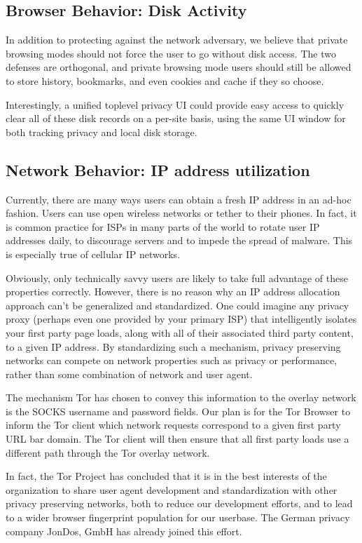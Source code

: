 \documentclass[letterpaper,11pt]{llncs}
\begin{document}
\subsection{Browser Behavior: Disk Activity}

In addition to protecting against the network adversary, we believe that
private browsing modes should not force the user to go without disk access. The
two defenses are orthogonal, and private browsing mode users should still be
allowed to store history, bookmarks, and even cookies and cache if they so
choose.

Interestingly, a unified toplevel privacy UI could provide easy access to
quickly clear all of these disk records on a per-site basis, using the same UI
window for both tracking privacy and local disk storage.

\subsection{Network Behavior: IP address utilization}

Currently, there are many ways users can obtain a fresh IP address in an
ad-hoc fashion. Users can use open wireless networks or tether to their
phones. In fact, it is common practice for ISPs in many parts of the world to
rotate user IP addresses daily, to discourage servers and to impede the spread
of malware. This is especially true of cellular IP networks.

Obviously, only technically savvy users are likely to take full advantage of
these properties correctly. However, there is no reason why an IP address
allocation approach can't be generalized and standardized. One could imagine
any privacy proxy (perhaps even one provided by your primary ISP) that
intelligently isolates your first party page loads, along with all of their
associated third party content, to a given IP address. By standardizing such a
mechanism, privacy preserving networks can compete on network properties such
as privacy or performance, rather than some combination of network and user
agent. 

The mechanism Tor has chosen to convey this information to the overlay network
is the SOCKS username and password fields. Our plan is for the Tor Browser to
inform the Tor client which network requests correspond to a given first party
URL bar domain. The Tor client will then ensure that all first party loads use
a different path through the Tor overlay network.

In fact, the Tor Project has concluded that it is in the best interests of the
organization to share user agent development and standardization with other
privacy preserving networks, both to reduce our development efforts, and to
lead to a wider browser fingerprint population for our userbase. The German
privacy company JonDos, GmbH has already joined this effort.
\end{document}
